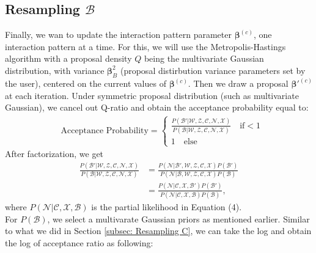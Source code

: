 \documentclass[a4paper]{article}
\begin{document}
 \subsection{Resampling $\mathcal{B}$}  \label{subsec: Resampling B}
 Finally, we wan to update the interaction pattern parameter $\boldsymbol{\beta}^{(c)}$, one interaction pattern at a time. For this, we will use the Metropolis-Hastings algorithm with a proposal density $Q$ being the multivariate Gaussian distribution, with variance $\boldsymbol{\beta}^2_B$ (proposal distirbution variance parameters set by the
 user), centered on the current values of $\boldsymbol{\beta}^{(c)}$. Then we draw a proposal $\boldsymbol{\beta}'^{(c)}$ at each iteration. Under symmetric proposal distribution (such as multivariate Gaussian), we cancel out Q-ratio and obtain the acceptance probability equal to:
 \begin{equation}
 \begin{split}
 & \mbox{Acceptance Probability}=
 \begin{cases}  \frac{P(\mathcal{B'}|\mathcal{W}, \mathcal{Z}, \mathcal{C}, \mathcal{N}, \mathcal{X})}{P(\mathcal{B}|\mathcal{W}, \mathcal{Z}, \mathcal{C}, \mathcal{N}, \mathcal{X})}\quad\text{if}  <1\\
 1 \quad \text{else}
 \end{cases}
 \end{split}
 \end{equation}
 After factorization, we get
 \begin{equation}
 \begin{aligned}
 \frac{P(\mathcal{B'}|\mathcal{W},\mathcal{Z}, \mathcal{C}, \mathcal{N}, \mathcal{X})}{P(\mathcal{B}|\mathcal{W}, \mathcal{Z}, \mathcal{C}, \mathcal{N}, \mathcal{X})} &=\frac{P(\mathcal{N}|\mathcal{B'}, \mathcal{W}, \mathcal{Z}, \mathcal{C}, \mathcal{X})P(\mathcal{B'})}{P(\mathcal{N}|\mathcal{B}, \mathcal{W}, \mathcal{Z},  \mathcal{C}, \mathcal{X})P(\mathcal{B})}\\&=\frac{P(\mathcal{N}|\mathcal{C}, \mathcal{X}, \mathcal{B'})P(\mathcal{B'})}{P(\mathcal{N}|\mathcal{C}, \mathcal{X}, \mathcal{B})P(\mathcal{B})},
 \end{aligned}
 \end{equation}
 where $P(\mathcal{N}|\mathcal{C}, \mathcal{X}, \mathcal{B})$ is the partial likelihood in Equation (4).\\ \newline For $P(\mathcal{B})$, we select a multivarate Gaussian priors as mentioned earlier. Similar to what we did in Section \ref{subsec: Resampling C}, we can take the log and obtain the log of acceptance ratio as following:
\end{document}
